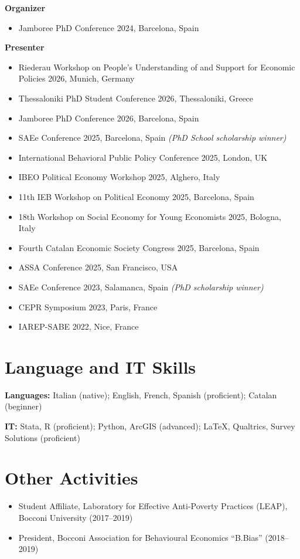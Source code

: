 \documentclass[11pt, a4paper]{article}
\begin{document}
\textbf{Organizer}
\begin{itemize}
  \item Jamboree PhD Conference 2024, Barcelona, Spain
\end{itemize}

\textbf{Presenter}
\begin{itemize}
    \item Riederau Workshop on People’s Understanding of and Support for Economic Policies 2026, Munich, Germany 
    \item Thessaloniki PhD Student Conference 2026, Thessaloniki, Greece 
    \item Jamboree PhD Conference 2026, Barcelona, Spain
  \item SAEe Conference 2025, Barcelona, Spain \textit{(PhD School scholarship winner)}
  \item International Behavioral Public Policy Conference 2025, London, UK
  \item IBEO Political Economy Workshop 2025, Alghero, Italy
  \item 11th IEB Workshop on Political Economy 2025, Barcelona, Spain
  \item 18th Workshop on Social Economy for Young Economists 2025, Bologna, Italy
  \item Fourth Catalan Economic Society Congress 2025, Barcelona, Spain
  \item ASSA Conference 2025, San Francisco, USA
  \item SAEe Conference 2023, Salamanca, Spain \textit{(PhD scholarship winner)}
  \item CEPR Symposium 2023, Paris, France
  \item IAREP-SABE 2022, Nice, France
\end{itemize}

\section{Language and IT Skills}

\textbf{Languages:} Italian (native); English, French, Spanish (proficient); Catalan (beginner)

\textbf{IT:} Stata, R (proficient); Python, ArcGIS (advanced); \LaTeX, Qualtrics, Survey Solutions (proficient)

\section{Other Activities}

\begin{itemize}
  \item Student Affiliate, Laboratory for Effective Anti-Poverty Practices (LEAP),
        Bocconi University (2017--2019)
  \item President, Bocconi Association for Behavioural Economics ``B.Bias'' (2018--2019)
\end{itemize}
\end{document}
